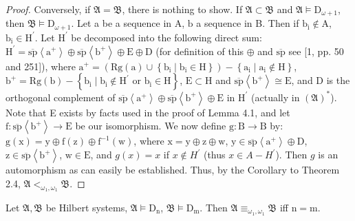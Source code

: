 \documentclass{article}
\begin{document}
{{{\begin{proof}
Conversely, if $\mathfrak{A}=\mathfrak{B}$, there is nothing to show. If $\mathfrak{A} \subset \mathfrak{B}$ and $\mathfrak{A} \vDash \mathrm{D}_{\omega+1}$, then $\mathfrak{B} \vDash \mathrm{D}_{\omega+1}$. Let a be a sequence in $\mathrm{A}$, $\mathrm{b}$ a sequence in B. Then if $\mathrm{b}_{\mathrm{i}} \notin \mathrm{A}$, $\mathrm{b}_{\mathrm{i}} \in \mathrm{H}^{\prime}$. Let $\mathrm{H}^{\prime}$ be decomposed into the following direct sum: $\mathrm{H}^{\prime}=\overline{\mathrm{sp}}\left\langle\mathrm{a}^{+}\right\rangle \oplus \overline{\mathrm{sp}}\left\langle\mathrm{b}^{+}\right\rangle \oplus \mathrm{E} \oplus \mathrm{D}$ (for definition of this $\oplus$ and $\overline{\mathrm{sp}}$ see [1, pp. 50 and 251]), where $\mathrm{a}^{+}=(\mathrm{Rg}(\mathrm{a}) \cup \left\{\mathrm{b}_{\mathrm{i}} \mid \mathrm{b}_{\mathrm{i}} \in \mathrm{H}\right\})-\left\{\mathrm{a}_{\mathrm{i}} \mid \mathrm{a}_{\mathrm{i}} \notin \mathrm{H}\right\}$, $\mathrm{b}^{+}=\mathrm{Rg}(\mathrm{b})-\left\{\mathrm{b}_{\mathrm{i}} \mid \mathrm{b}_{\mathrm{i}} \notin \mathrm{H}^{\prime} \text{ or } \mathrm{b}_{\mathrm{i}} \in \mathrm{H}\right\}$, $\mathrm{E} \subset \mathrm{H}$ and $\overline{\mathrm{sp}}\left\langle\mathrm{b}^{+}\right\rangle \cong \mathrm{E}$, and D is the orthogonal complement of $\overline{\mathrm{sp}}\left\langle\mathrm{a}^{+}\right\rangle \oplus \overline{\mathrm{sp}}\left\langle\mathrm{b}^{+}\right\rangle \oplus \mathrm{E}$ in $\mathrm{H}^{\prime}$ (actually in $(\mathfrak{A})^{*}$). Note that E exists by facts used in the proof of Lemma 4.1, and let $\mathrm{f}: \overline{\mathrm{sp}}\left\langle\mathrm{b}^{+}\right\rangle \rightarrow \mathrm{E}$ be our isomorphism. We now define $\mathrm{g}: \mathrm{B} \rightarrow \mathrm{B}$ by: $\mathrm{g}(\mathrm{x})=\mathrm{y} \oplus \mathrm{f}(\mathrm{z}) \oplus \mathrm{f}^{-1}(\mathrm{w})$, where $\mathrm{x}=\mathrm{y} \oplus \mathrm{z} \oplus \mathrm{w}$, $\mathrm{y} \in \overline{\mathrm{sp}}\left\langle\mathrm{a}^{+}\right\rangle \oplus \mathrm{D}$, $\mathrm{z} \in \overline{\mathrm{sp}}\left\langle\mathrm{b}^{+}\right\rangle$, $\mathrm{w} \in \mathrm{E}$, and $g(x)=x$ if $x \notin H^{\prime}$ (thus $x \in A-H^{\prime}$). Then $g$ is an automorphism as can easily be established. Thus, by the Corollary to Theorem 2.4, $\mathfrak{A} <_{\omega_{1}, \omega_{1}} \mathfrak{B}$.
\end{proof}
\begin{corollary}
Let $\mathfrak{A}, \mathfrak{B}$ be Hilbert systems, $\mathfrak{A} \vDash \mathrm{D}_{\mathrm{n}}$, $\mathfrak{B} \vDash \mathrm{D}_{\mathrm{m}}$. Then $\mathfrak{A} \equiv_{\omega_{1}, \omega_{1}} \mathfrak{B}$ iff $\mathrm{n}=\mathrm{m}$.

\end{corollary}}}}
\end{document}
